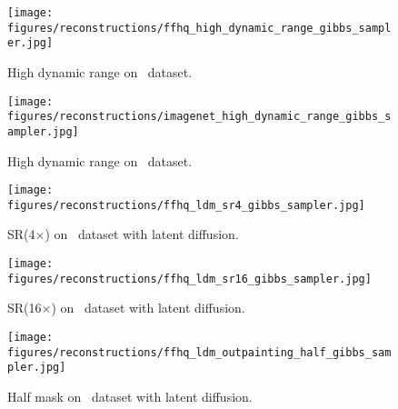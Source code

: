 \begin{figure}
    \centering
    \texttt{[image: figures/reconstructions/ffhq\_high\_dynamic\_range\_gibbs\_sampler.jpg]}
    \caption{High dynamic range on \ffhq\ dataset.}
\end{figure}
\begin{figure}
    \centering
    \texttt{[image: figures/reconstructions/imagenet\_high\_dynamic\_range\_gibbs\_sampler.jpg]}
    \caption{High dynamic range on \imagenet\ dataset.}
\end{figure}
\begin{figure}
    \centering
    \texttt{[image: figures/reconstructions/ffhq\_ldm\_sr4\_gibbs\_sampler.jpg]}
    \caption{SR(4$\times$) on \ffhq\ dataset with latent diffusion.}
\end{figure}
\begin{figure}
    \centering
    \texttt{[image: figures/reconstructions/ffhq\_ldm\_sr16\_gibbs\_sampler.jpg]}
    \caption{SR(16$\times$) on \ffhq\ dataset with latent diffusion.}
\end{figure}
\begin{figure}
    \centering
    \texttt{[image: figures/reconstructions/ffhq\_ldm\_outpainting\_half\_gibbs\_sampler.jpg]}
    \caption{Half mask on \ffhq\ dataset with latent diffusion.}
\end{figure}


